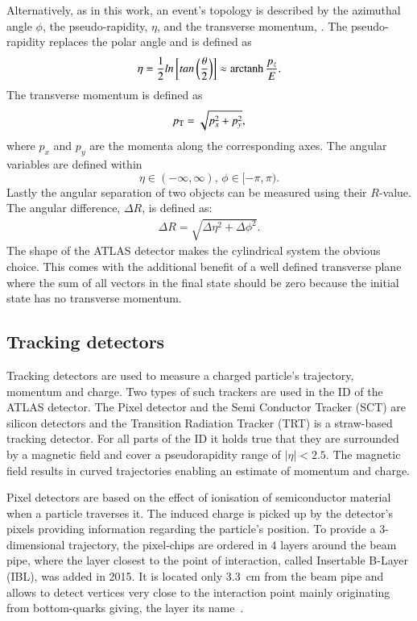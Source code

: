 Alternatively, as in this work, an event's topology is described by the azimuthal angle $\phi$, the pseudo-rapidity, $\eta$, and the transverse momentum, \pT. The pseudo-rapidity replaces the polar angle and is defined as
%
\begin{equation}
\eta = \frac{1}{2} ln\left[ tan\left(\frac{\theta}{2}\right)\right] \approx \operatorname{arctanh}\frac{p_z}{E}.
\end{equation}
%
The transverse momentum is defined as
%
\begin{equation}
p_{\text{T}} = \sqrt{p_x^2 + p_y^2},
\end{equation}
where $p_x$ and $p_y$ are the momenta along the corresponding axes. 
%
The angular variables are defined within
%
\begin{equation}
\eta \in (-\infty,\infty),\,
\phi \in [-\pi,\pi).
\end{equation}
%
Lastly the angular separation of two objects can be measured using their $R$-value. The angular difference, $\Delta R$, is defined as:
\begin{align}
\Delta R = \sqrt{\Delta \eta^2 + \Delta \phi^2}.
\end{align}
%
The shape of the ATLAS detector makes the cylindrical system the obvious choice. This comes with the additional benefit of a well defined transverse plane where the sum of all vectors in the final state should be zero because the initial state has no transverse momentum.



\subsection{Tracking detectors}

Tracking detectors are used to measure a charged particle's trajectory, momentum and charge. Two types of such trackers are used in the ID of the ATLAS detector. The Pixel detector and the Semi Conductor Tracker (SCT) are silicon detectors and the Transition Radiation Tracker (TRT) is a straw-based tracking detector. For all parts of the ID it holds true that they are surrounded by a magnetic field and cover a pseudorapidity range of $|\eta| < 2.5$. The magnetic field results in curved trajectories enabling an estimate of momentum and charge\cite{leo}.

Pixel detectors are based on the effect of ionisation of semiconductor material when a particle traverses it. The induced charge is picked up by the detector's pixels providing information regarding the particle's position. To provide a 3-dimensional trajectory, the pixel-chips are ordered in 4 layers around the beam pipe, where the layer closest to the point of interaction, called Insertable B-Layer (IBL), was added in 2015. It is located only \SI{3.3}{\centi \metre} from the beam pipe and allows to detect vertices very close to the interaction point mainly originating from bottom-quarks giving, the layer its name~\cite{pixel_run2}.

